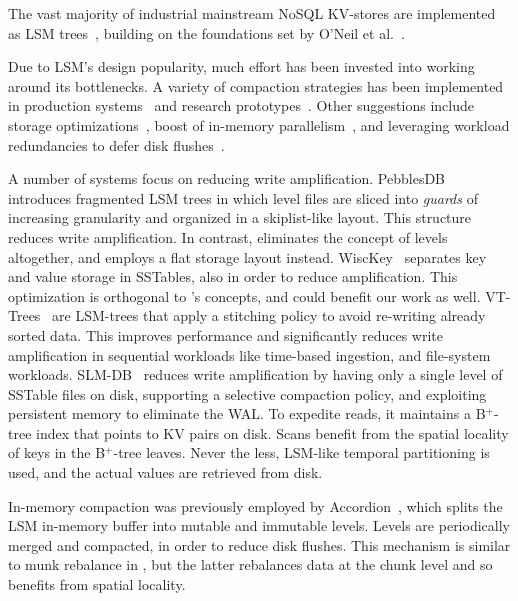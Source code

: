 

The vast majority of industrial mainstream NoSQL KV-stores are  implemented as LSM trees~\cite{hbase, 
RocksDB, scylladb, Bigtable2008, cassandra2010}, building on the foundations set by O'Neil 
et al.~\cite{DBLP:journals/acta/ONeilCGO96, Muth1998}. 

Due to LSM's design popularity, much effort has been invested into working around its bottlenecks.
A variety of compaction strategies has been implemented in production systems~\cite{CallaghanCompaction, 
ScyllaCompaction} and research prototypes~\cite{triad, PebblesDB, vttrees, slmdb}. Other suggestions include storage
optimizations~\cite{WiscKey, PebblesDB, vttrees, slmdb}, boost of in-memory parallelism~\cite{scylladb, clsm2015}, and leveraging 
 workload redundancies to defer disk flushes~\cite{triad, accordion}. 

A number of systems focus on reducing write amplification.
PebblesDB~\cite{PebblesDB} introduces fragmented LSM trees in which level files are 
sliced into {\em guards\/} of increasing granularity and organized in a skiplist-like layout. This structure 
reduces write amplification. In contrast, \sys\/ eliminates the concept of levels altogether, 
and employs a flat storage layout instead. WiscKey~\cite{WiscKey} separates key and value storage 
in SSTables, also in order to reduce amplification. This optimization is orthogonal to \sys's concepts,
and could benefit our work as well. 
VT-Trees~\cite{vttrees} are LSM-trees that apply a stitching policy to avoid re-writing already sorted data. This improves performance and significantly reduces write amplification in sequential workloads like time-based ingestion, and file-system workloads. 
SLM-DB~\cite{slmdb} reduces write amplification by having only a single level of SSTable files on disk, supporting a selective compaction policy, and
exploiting persistent memory to eliminate the WAL. To expedite reads, it maintains a B$^+$-tree index that points to KV pairs on disk. Scans benefit from the spatial locality of keys in the B$^+$-tree leaves. Never the less, LSM-like temporal partitioning is used, and the actual values are retrieved from disk.

In-memory compaction was previously employed by
Accordion~\cite{accordion}, which splits the LSM in-memory buffer into mutable 
and immutable levels. Levels are periodically merged and compacted, 
in order to reduce disk flushes. This mechanism is similar to munk rebalance in \sys, 
but the latter rebalances data at the chunk level and so benefits from spatial locality.




